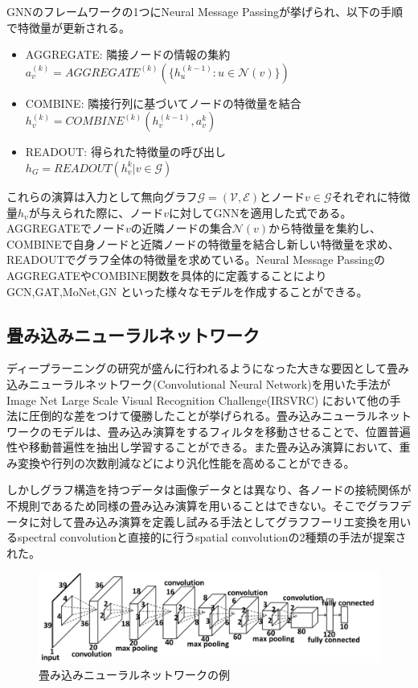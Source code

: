 GNNのフレームワークの1つにNeural Message Passing\cite{gilmer2017mpnn,ying2019gnnexplainer,zhang2020gnnguard}が挙げられ、以下の手順で特徴量が更新される。
\begin{itemize}
\label{GNN}
\item AGGREGATE: 隣接ノードの情報の集約 \\
$a_{v}^{(k)} = AGGREGATE^{(k)}(\{h_u^{(k-1)}:u \in \mathcal{N}(v)\})$
\item COMBINE: 隣接行列に基づいてノードの特徴量を結合 \\ 
$h_{v}^{(k)} = COMBINE^{(k)}(h_v^{(k-1)},a_v^{k})$
\item READOUT: 得られた特徴量の呼び出し \\
$h_G = READOUT(h_v^{k}| v \in \mathcal{G})$
\end{itemize}
これらの演算は入力として無向グラフ$\mathcal{G}=(\mathcal{V},\mathcal{E})$とノード$v \in \mathcal{G}$それぞれに特徴量$h_v$が与えられた際に、ノード$v$に対してGNNを適用した式である。AGGREGATEでノード$v$の近隣ノードの集合$\mathcal{N}(v)$から特徴量を集約し、COMBINEで自身ノードと近隣ノードの特徴量を結合し新しい特徴量を求め、READOUTでグラフ全体の特徴量を求めている。Neural Message PassingのAGGREGATEやCOMBINE関数を具体的に定義することによりGCN\cite{kipf2016GCN},GAT\cite{velivckovic2017GAT},MoNet\cite{monti2017geometric},GN \cite{battaglia2018relational}といった様々なモデルを作成することができる\cite{xu2018how_powerful_gnn}。

\subsection{畳み込みニューラルネットワーク}
ディープラーニングの研究が盛んに行われるようになった大きな要因として畳み込みニューラルネットワーク(Convolutional Neural Network)を用いた手法\cite{krizhevsky2012imagenet}が Image Net Large Scale Visual Recognition Challenge(IRSVRC) において他の手法に圧倒的な差をつけて優勝したことが挙げられる。畳み込みニューラルネットワークのモデルは、畳み込み演算をするフィルタを移動させることで、位置普遍性や移動普遍性を抽出し学習することができる。また畳み込み演算において、重み変換や行列の次数削減などにより汎化性能を高めることができる。

しかしグラフ構造を持つデータは画像データとは異なり、各ノードの接続関係が不規則であるため同様の畳み込み演算を用いることはできない。そこでグラフデータに対して畳み込み演算を定義し試みる手法としてグラフフーリエ変換を用いるspectral convolutionと直接的に行うspatial convolutionの2種類の手法が提案された。

\begin{figure}[tb]
  \centering
  \includegraphics[width=\hsize]{figures/cnn.png}
  \caption{畳み込みニューラルネットワークの例\cite{sun2013deep}}
  \label{fig:cnn}
\end{figure}


